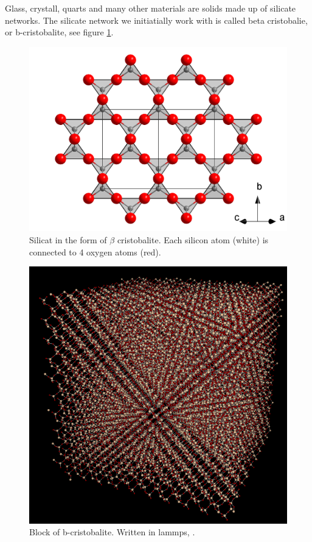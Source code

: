 \documentclass[10pt, a4paper]{report}
\begin{document}
Glass, crystall, quarts and many other materials are solids made up of silicate networks.
The silicate network we initiatially work with is called beta cristobalie, or b-cristobalite, see figure \ref{fig:beta}.
\begin{figure}[h] 

 \includegraphics[scale=0.15]{beta.png}\centering
 \caption{\label{fig:beta}Silicat in the form of $\beta$ cristobalite. Each silicon atom (white) is connected to 4 oxygen atoms (red).}
 
\end{figure}

\begin{figure}[h] 

 \includegraphics[scale=0.35]{block}\centering
 \caption{\label{fig:pores}Block of b-cristobalite. Written in lammps, .}
 
\end{figure}
\end{document}
